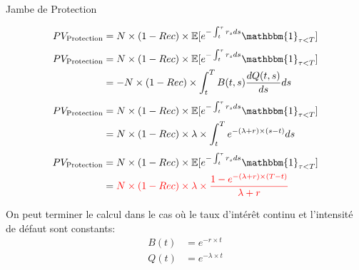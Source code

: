 \documentclass{beamer}
\begin{document}
\begin{frame}{Jambe de Protection}
\begin{overprint}
\begin{align*}
PV_{\text{Protection}}&=N \times (1-Rec)\times\mathbb{E}[e^{-\int_{t}^{\tau}r_s ds}\mathbbm{1}_{\tau<T}]\\
\end{align*}
\begin{align*}
PV_{\text{Protection}}&=N \times (1-Rec)\times\mathbb{E}[e^{-\int_{t}^{\tau}r_s ds}\mathbbm{1}_{\tau<T}]\\
&=-N \times (1-Rec) \times \int_{t}^{T} B(t,s) \frac{dQ(t,s)}{ds}ds\\
\end{align*}
\begin{align*}
PV_{\text{Protection}}&=N \times (1-Rec)\times\mathbb{E}[e^{-\int_{t}^{\tau}r_s ds}\mathbbm{1}_{\tau<T}]\\
&=N \times (1-Rec) \times \lambda \times \int_{t}^{T} e^{-(\lambda+r) \times (s-t)}ds\\
\end{align*}
\begin{align*}
PV_{\text{Protection}}&=N \times (1-Rec)\times\mathbb{E}[e^{-\int_{t}^{\tau}r_s ds}\mathbbm{1}_{\tau<T}]\\
&=\color{red}{N \times (1-Rec) \times \lambda \times\frac{ 1-e^{-(\lambda+r) \times (T-t)}}{\lambda+r}}\\
\end{align*}
\end{overprint}
On peut terminer le calcul dans le cas où le taux d'intérêt continu et l'intensité de défaut sont constants:
\begin{align*}
B(t)&=e^{-r \times t}\\
Q(t)&=e^{-\lambda \times t}
\end{align*}
\end{frame}
\end{document}
